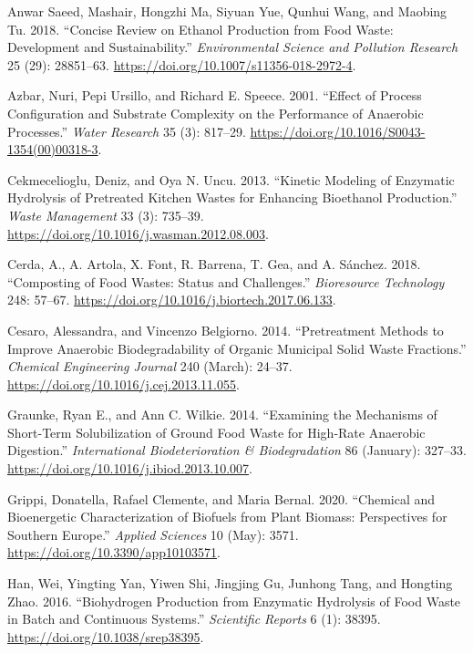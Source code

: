 \documentclass[11pt]{report}
\begin{document}
\begin{hangparas}{1.5em}{1}
\hypertarget{citeproc_bib_item_1}{Anwar Saeed, Mashair, Hongzhi Ma, Siyuan Yue, Qunhui Wang, and Maobing Tu. 2018. “Concise Review on Ethanol Production from Food Waste: Development and Sustainability.” \textit{Environmental Science and Pollution Research} 25 (29): 28851–63. \url{https://doi.org/10.1007/s11356-018-2972-4}.}

\hypertarget{citeproc_bib_item_2}{Azbar, Nuri, Pepi Ursillo, and Richard E. Speece. 2001. “Effect of Process Configuration and Substrate Complexity on the Performance of Anaerobic Processes.” \textit{Water Research} 35 (3): 817–29. \url{https://doi.org/10.1016/S0043-1354(00)00318-3}.}

\hypertarget{citeproc_bib_item_3}{Cekmecelioglu, Deniz, and Oya N. Uncu. 2013. “Kinetic Modeling of Enzymatic Hydrolysis of Pretreated Kitchen Wastes for Enhancing Bioethanol Production.” \textit{Waste Management} 33 (3): 735–39. \url{https://doi.org/10.1016/j.wasman.2012.08.003}.}

\hypertarget{citeproc_bib_item_4}{Cerda, A., A. Artola, X. Font, R. Barrena, T. Gea, and A. Sánchez. 2018. “Composting of Food Wastes: Status and Challenges.” \textit{Bioresource Technology} 248: 57–67. \url{https://doi.org/10.1016/j.biortech.2017.06.133}.}

\hypertarget{citeproc_bib_item_5}{Cesaro, Alessandra, and Vincenzo Belgiorno. 2014. “Pretreatment Methods to Improve Anaerobic Biodegradability of Organic Municipal Solid Waste Fractions.” \textit{Chemical Engineering Journal} 240 (March): 24–37. \url{https://doi.org/10.1016/j.cej.2013.11.055}.}

\hypertarget{citeproc_bib_item_6}{Graunke, Ryan E., and Ann C. Wilkie. 2014. “Examining the Mechanisms of Short-Term Solubilization of Ground Food Waste for High-Rate Anaerobic Digestion.” \textit{International Biodeterioration \& Biodegradation} 86 (January): 327–33. \url{https://doi.org/10.1016/j.ibiod.2013.10.007}.}

\hypertarget{citeproc_bib_item_7}{Grippi, Donatella, Rafael Clemente, and Maria Bernal. 2020. “Chemical and Bioenergetic Characterization of Biofuels from Plant Biomass: Perspectives for Southern Europe.” \textit{Applied Sciences} 10 (May): 3571. \url{https://doi.org/10.3390/app10103571}.}

\hypertarget{citeproc_bib_item_8}{Han, Wei, Yingting Yan, Yiwen Shi, Jingjing Gu, Junhong Tang, and Hongting Zhao. 2016. “Biohydrogen Production from Enzymatic Hydrolysis of Food Waste in Batch and Continuous Systems.” \textit{Scientific Reports} 6 (1): 38395. \url{https://doi.org/10.1038/srep38395}.}


\end{hangparas}
\end{document}
